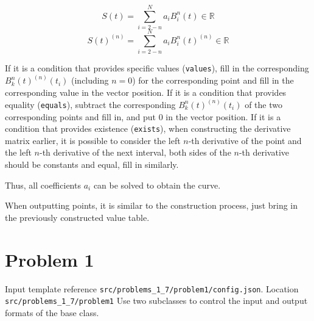 \documentclass[a4paper]{article}
\begin{document}
\[
S(t) = \sum_{i=2-n}^{N} a_i B_i^n(t) \in \mathbb{R}
\]
\[
S(t)^{(n)} = \sum_{i=2-n}^{N} a_i B_i^n(t)^{(n)} \in \mathbb{R}
\]

If it is a condition that provides specific values (\texttt{values}), fill in the corresponding $B_k^n(t)^{(n)}(t_i)$ (including $n=0$) for the corresponding point and fill in the corresponding value in the vector position. If it is a condition that provides equality (\texttt{equals}), subtract the corresponding $B_k^n(t)^{(n)}(t_i)$ of the two corresponding points and fill in, and put 0 in the vector position. If it is a condition that provides existence (\texttt{exists}), when constructing the derivative matrix earlier, it is possible to consider the left $n$-th derivative of the point and the left $n$-th derivative of the next interval, both sides of the $n$-th derivative should be constants and equal, fill in similarly.

Thus, all coefficients $a_i$ can be solved to obtain the curve.

When outputting points, it is similar to the construction process, just bring in the previously constructed value table.\\

\section*{Problem 1}
Input template reference \texttt{src/problems\_1\_7/problem1/config.json}.
Location \texttt{src/problems\_1\_7/problem1}
Use two subclasses to control the input and output formats of the base class.
\end{document}

